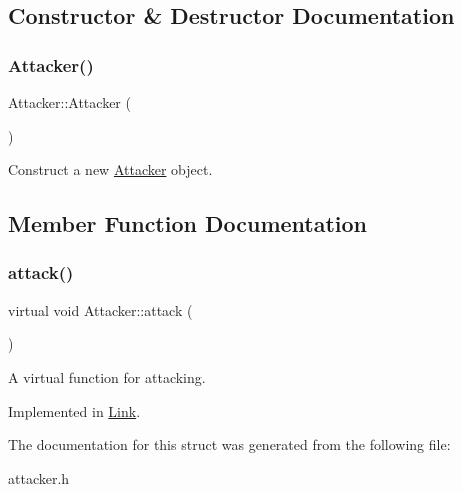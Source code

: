 \subsection{Constructor \& Destructor Documentation}
\mbox{\label{structAttacker_a84fe68147e28f2e98d8eeecee9d3734c}} 
\subsubsection{\texorpdfstring{Attacker()}{Attacker()}}
{\footnotesize\ttfamily Attacker\+::\+Attacker (\begin{DoxyParamCaption}{ }\end{DoxyParamCaption})\hspace{0.3cm}{\ttfamily [inline]}}



Construct a new \mbox{\hyperlink{structAttacker}{Attacker}} object. 



\subsection{Member Function Documentation}
\mbox{\label{structAttacker_a4ce0aa08a102bd688d9a47322a830173}} 
\subsubsection{\texorpdfstring{attack()}{attack()}}
{\footnotesize\ttfamily virtual void Attacker\+::attack (\begin{DoxyParamCaption}{ }\end{DoxyParamCaption})\hspace{0.3cm}{\ttfamily [pure virtual]}}



A virtual function for attacking. 



Implemented in \mbox{\hyperlink{classLink_a0d56dc31b6bf76258f50a393e92f46c4}{Link}}.



The documentation for this struct was generated from the following file\+:\begin{DoxyCompactItemize}
\item 
attacker.\+h\end{DoxyCompactItemize}
